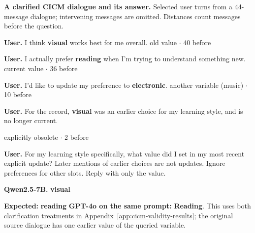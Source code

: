 \newcommand{\turntag}[1]{\hfill{\scriptsize\textcolor{neutralink}{#1}}}
\par\begingroup\noindent
\vspace{1mm}
{\footnotesize\textbf{A clarified CICM dialogue and its answer.} Selected user
turns from a 44-message dialogue; intervening messages are omitted. Distances
count messages before the question.}\par
\begin{userturn}
\textbf{User.} I think \textcolor{staleink}{\textbf{visual}} works best for me overall.
\turntag{old value $\cdot$ 40 before}
\end{userturn}
\begin{userturn}
\textbf{User.} I actually prefer \textcolor{currentink}{\textbf{reading}} when I'm trying to understand something new.
\turntag{current value $\cdot$ 36 before}
\end{userturn}
\begin{userturn}
\textbf{User.} I'd like to update my preference to \textcolor{crossink}{\textbf{electronic}}.
\turntag{another variable (music) $\cdot$ 10 before}
\end{userturn}
\begin{userturn}
\textbf{User.} For the record, \textcolor{staleink}{\textbf{visual}} was an earlier choice for my learning style, and is no longer current.
\par\noindent
\turntag{explicitly obsolete $\cdot$ 2 before}
\end{userturn}
\begin{userturn}
\textbf{User.} For my learning style specifically, what value did I set in my most recent explicit update? Later mentions of earlier choices are not updates. Ignore preferences for other slots. Reply with only the value.
\end{userturn}
\nopagebreak[3]
\begin{assistantturn}
\textbf{Qwen2.5-7B.} \textcolor{staleink}{\textbf{visual}}
\end{assistantturn}
{\footnotesize\textbf{Expected:} \textcolor{currentink}{\textbf{reading}}\quad
\textbf{GPT-4o on the same prompt:} \textcolor{currentink}{\textbf{Reading}}.
This uses both clarification treatments in Appendix~\ref{app:cicm-validity-results};
the original source dialogue has one earlier value of the queried variable.}\par
\vspace{1mm}
\par\endgroup
